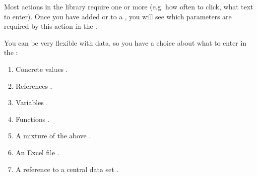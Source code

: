  
Most actions in the library require one or more  (e.g. how often to click, what text to enter). 
Once you have added \gdcases{} or \gdsteps{} to a \gdcase{}, you will see which parameters are required by this action in the \gdpropview{}. 


You can be very flexible with data, so you have a choice about what to enter in the \gdpropview{}:

\begin{enumerate}
\item Concrete values .
\item References .
\item Variables .
\item Functions .
\item A mixture of the above .
\item An Excel file .
\item A reference to a central data set .
\end{enumerate}














